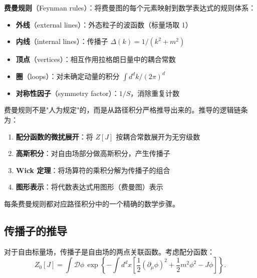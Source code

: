\begin{definition}[费曼规则]
\textbf{费曼规则}（Feynman rules）：将费曼图的每个元素映射到数学表达式的规则体系：
\begin{itemize}
    \item \textbf{外线}（external lines）：外态粒子的波函数（标量场取 1）
    \item \textbf{内线}（internal lines）：传播子 $\Delta(k) = 1/(k^2 + m^2)$
    \item \textbf{顶点}（vertices）：相互作用拉格朗日量中的耦合常数
    \item \textbf{圈}（loops）：对未确定动量的积分 $\int d^d k/(2\pi)^d$
    \item \textbf{对称性因子}（symmetry factor）：$1/S$，消除重复计数
\end{itemize}
\end{definition}

\begin{note}[费曼规则的物理来源]
费曼规则不是"人为规定"的，而是从路径积分严格推导出来的。推导的逻辑链条为：
\begin{enumerate}
    \item \textbf{配分函数的微扰展开}：将 $Z[J]$ 按耦合常数展开为无穷级数
    \item \textbf{高斯积分}：对自由场部分做高斯积分，产生传播子
    \item \textbf{Wick 定理}：将场算符的乘积分解为传播子的组合
    \item \textbf{图形表示}：将代数表达式用图形（费曼图）表示
\end{enumerate}
每条费曼规则都对应路径积分中的一个精确的数学步骤。
\end{note}


\subsection{传播子的推导}

\begin{theorem}[自由场传播子]
对于自由标量场，传播子是自由场的两点关联函数。考虑配分函数：
\begin{equation}
    Z_0[J] = \int \mathcal{D}\phi \, \exp\left\{-\int d^d x \left[\frac{1}{2}(\partial_\mu \phi)^2 + \frac{1}{2}m^2 \phi^2 - J\phi\right]\right\}.
\end{equation}
\end{theorem}


